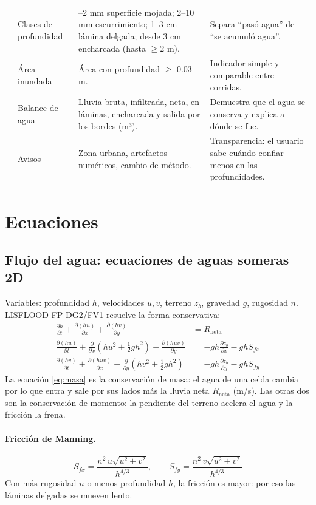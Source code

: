 \documentclass[11pt,letterpaper]{article}
\begin{document}
{\begin{longtable}{>{\raggedright\arraybackslash}p{2.1cm}>{\raggedright\arraybackslash}p{3.0cm}>{\raggedright\arraybackslash}p{5.3cm}>{\raggedright\arraybackslash}p{5.2cm}}
 & Clases de profundidad & 0.5–2 mm superficie mojada; 2–10 mm escurrimiento; 1–3 cm lámina delgada; desde 3 cm encharcada (hasta $\geq$2 m). & Separa ``pasó agua'' de ``se acumuló agua''.\\
 & Área inundada & Área con profundidad $\geq$ 0.03 m. & Indicador simple y comparable entre corridas.\\
 & Balance de agua & Lluvia bruta, infiltrada, neta, en láminas, encharcada y salida por los bordes (m³). & Demuestra que el agua se conserva y explica a dónde se fue.\\
 & Avisos & Zona urbana, artefactos numéricos, cambio de método. & Transparencia: el usuario sabe cuándo confiar menos en las profundidades.\\
\end{longtable}
}

\section{Ecuaciones}

\subsection{Flujo del agua: ecuaciones de aguas someras 2D}
Variables: profundidad $h$, velocidades $u,v$, terreno $z_b$, gravedad $g$, rugosidad $n$. LISFLOOD-FP DG2/FV1 resuelve la forma conservativa:
\begin{align}
\frac{\partial h}{\partial t}+\frac{\partial (hu)}{\partial x}+\frac{\partial (hv)}{\partial y} &= R_{\text{neta}} \label{eq:masa}\\
\frac{\partial (hu)}{\partial t}+\frac{\partial}{\partial x}\!\left(hu^2+\tfrac12 g h^2\right)+\frac{\partial (huv)}{\partial y} &= -g h\frac{\partial z_b}{\partial x}-g h S_{fx}\\
\frac{\partial (hv)}{\partial t}+\frac{\partial (huv)}{\partial x}+\frac{\partial}{\partial y}\!\left(hv^2+\tfrac12 g h^2\right) &= -g h\frac{\partial z_b}{\partial y}-g h S_{fy}
\end{align}
La ecuación \eqref{eq:masa} es la conservación de masa: el agua de una celda cambia por lo que entra y sale por sus lados más la lluvia neta $R_{\text{neta}}$ (m/s). Las otras dos son la conservación de momento: la pendiente del terreno acelera el agua y la fricción la frena.

\paragraph{Fricción de Manning.}
\begin{equation}
S_{fx}=\frac{n^2\,u\sqrt{u^2+v^2}}{h^{4/3}},\qquad S_{fy}=\frac{n^2\,v\sqrt{u^2+v^2}}{h^{4/3}}
\end{equation}
Con más rugosidad $n$ o menos profundidad $h$, la fricción es mayor: por eso las láminas delgadas se mueven lento.
\end{document}
